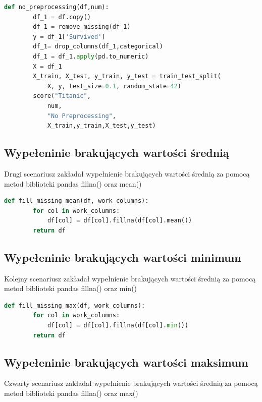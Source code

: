 \documentclass{book}
\begin{document}
\begin{lstlisting}[language=Python, caption={Brak przygotowania
     danych dla zbioru danych Titanic}, captionpos=b]
    def no_preprocessing(df,num):
        df_1 = df.copy()
        df_1 = remove_missing(df_1)
        y = df_1['Survived']
        df_1= drop_columns(df_1,categorical)
        df_1 = df_1.apply(pd.to_numeric)
        X = df_1
        X_train, X_test, y_train, y_test = train_test_split(
            X, y, test_size=0.1, random_state=42)
        score("Titanic",
            num,
            "No Preprocessing",
            X_train,y_train,X_test,y_test)
    \end{lstlisting}

\subsection{Wypełeninie brakujących wartości średnią}
Drugi scenariusz zakładał wypełnienie brakujących 
wartości średnią za pomocą metod biblioteki pandas 
fillna() oraz mean()

\begin{lstlisting}[language=Python, caption={Wypełnienie 
    brakujących wartości średnią}, captionpos=b]
    def fill_missing_mean(df, work_columns):
        for col in work_columns:
            df[col] = df[col].fillna(df[col].mean())
        return df
\end{lstlisting}

\subsection{Wypełeninie brakujących wartości minimum}
Kolejny scenariusz zakładał wypełnienie brakujących 
wartości średnią za pomocą metod biblioteki pandas fillna() 
oraz min()

\begin{lstlisting}[language=Python, caption={Wypełnienie 
    brakujących wartości minimum}, captionpos=b]
    def fill_missing_max(df, work_columns):
        for col in work_columns:
            df[col] = df[col].fillna(df[col].min())
        return df
\end{lstlisting}

\subsection{Wypełeninie brakujących wartości maksimum}
Czwarty scenariusz zakładał wypełnienie brakujących 
wartości średnią za pomocą metod biblioteki pandas 
fillna() oraz max()
\end{document}
